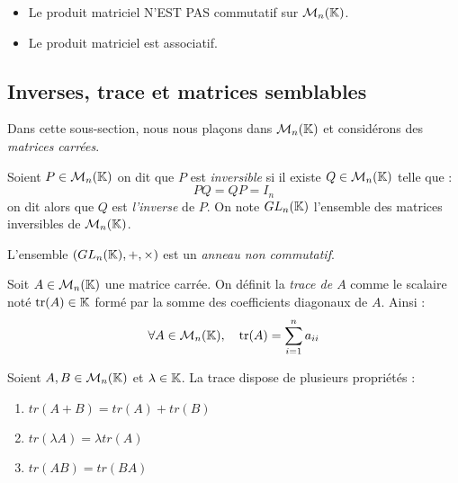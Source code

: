 \begin{prop}
    \begin{itemize}
        \item Le produit matriciel N'EST PAS commutatif sur $ \mathcal{M}_n(\mathbb{K})$. 
        \item  Le produit matriciel est associatif.
    \end{itemize}
\end{prop}

\subsection{Inverses, trace et matrices semblables}

Dans cette sous-section, nous nous plaçons dans $ \mathcal{M}_n(\mathbb{K})$ et considérons des 
\emph{matrices carrées}. 

\begin{definition}[Inverse]
    Soient $P \in \mathcal{M}_n(\mathbb{K})$ on dit que $P$ est \emph{inversible} 
    si il existe $ Q \in \mathcal{M}_n(\mathbb{K})$ telle que : 
        \[ PQ = QP = I_n \] 
    on dit alors que $Q$ est \emph{l'inverse} de $P$. 
    On note $ GL_n(\mathbb{K})$ l'ensemble des matrices inversibles de $ \mathcal{M}_n(\mathbb{K})$. 
\end{definition}

\begin{proposition}
    L'ensemble $ (GL_n(\mathbb{K}), +, \times)$ est un \emph{anneau non commutatif}. 
\end{proposition}

\begin{definition}[Trace]
    Soit $A \in  \mathcal{M}_n(\mathbb{K})$ une matrice carrée. On définit la \emph{trace de $A$}
    comme le scalaire noté $ \text{tr}(A) \in \mathbb{K}$ formé par la somme des coefficients 
    diagonaux de $A$. Ainsi : 
        \[ \forall A \in  \mathcal{M}_n(\mathbb{K}), \quad \text{tr}(A) = \sum_{i=1}^{n} a_{ii} \] 
\end{definition}

\begin{prop}
    Soient $A,B \in  \mathcal{M}_n(\mathbb{K})$ et $ \lambda \in \mathbb{K}$. 
    La trace dispose de plusieurs propriétés :
    \begin{enumerate}
        \item $tr(A + B) = tr(A) + tr(B) $ 
        \item $tr(\lambda A) = \lambda tr(A) $ 
        \item $ tr(AB) = tr(BA) $
    \end{enumerate}
\end{prop}

